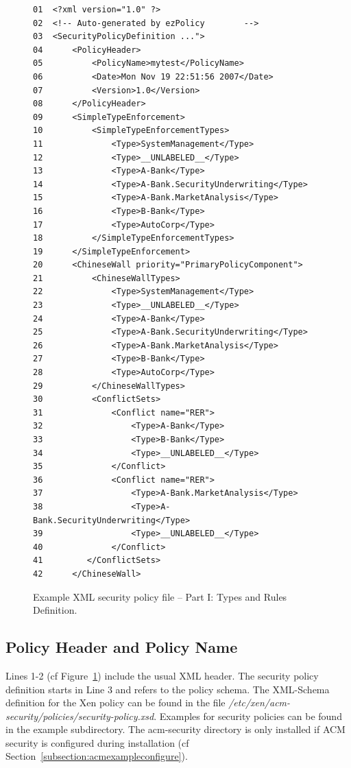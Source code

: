 \documentclass[11pt,twoside,final,openright]{report}
\begin{document}
\begin{figure}
\begin{scriptsize}
\begin{verbatim}
01  <?xml version="1.0" ?>
02  <!-- Auto-generated by ezPolicy        -->
03  <SecurityPolicyDefinition ...">
04      <PolicyHeader>
05          <PolicyName>mytest</PolicyName>
06          <Date>Mon Nov 19 22:51:56 2007</Date>
07          <Version>1.0</Version>
08      </PolicyHeader>
09      <SimpleTypeEnforcement>
10          <SimpleTypeEnforcementTypes>
11              <Type>SystemManagement</Type>
12              <Type>__UNLABELED__</Type>
13              <Type>A-Bank</Type>
14              <Type>A-Bank.SecurityUnderwriting</Type>
15              <Type>A-Bank.MarketAnalysis</Type>
16              <Type>B-Bank</Type>
17              <Type>AutoCorp</Type>
18          </SimpleTypeEnforcementTypes>
19      </SimpleTypeEnforcement>
20      <ChineseWall priority="PrimaryPolicyComponent">
21          <ChineseWallTypes>
22              <Type>SystemManagement</Type>
23              <Type>__UNLABELED__</Type>
24              <Type>A-Bank</Type>
25              <Type>A-Bank.SecurityUnderwriting</Type>
26              <Type>A-Bank.MarketAnalysis</Type>
27              <Type>B-Bank</Type>
28              <Type>AutoCorp</Type>
29          </ChineseWallTypes>
30          <ConflictSets>
31              <Conflict name="RER">
32                  <Type>A-Bank</Type>
33                  <Type>B-Bank</Type>
34                  <Type>__UNLABELED__</Type>
35              </Conflict>
36              <Conflict name="RER">
37                  <Type>A-Bank.MarketAnalysis</Type>
38                  <Type>A-Bank.SecurityUnderwriting</Type>
39                  <Type>__UNLABELED__</Type>
40              </Conflict>
41         </ConflictSets>
42      </ChineseWall>
\end{verbatim}
\end{scriptsize}
\caption{Example XML security policy file -- Part I: Types and Rules Definition.}
\label{fig:acmxmlfilea}
\end{figure}

\subsection{Policy Header and Policy Name}
\label{subsection:acmnaming}
Lines 1-2 (cf Figure~\ref{fig:acmxmlfilea}) include the usual XML
header. The security policy definition starts in Line 3 and refers to
the policy schema. The XML-Schema definition for the Xen policy can be
found in the file
\textit{/etc/xen/acm-security/policies/security-policy.xsd}. Examples
for security policies can be found in the example subdirectory. The
acm-security directory is only installed if ACM security is configured
during installation (cf Section~\ref{subsection:acmexampleconfigure}).
\end{document}
